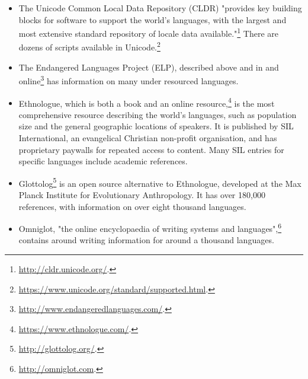 \begin{itemize}
\item The Unicode Common Local Data Repository (CLDR) "provides key building blocks for software to support the world's languages, with the largest and most extensive standard repository of locale data available."\footnote{\href{http://cldr.unicode.org/}{http://cldr.unicode.org/}. } There are dozens of scripts available in Unicode.\footnote{\href{https://www.unicode.org/standard/supported.html}{https://www.unicode.org/standard/supported.html}. }

\item The Endangered Languages Project (ELP), described above and in \citet{lee2016assessing} and online\footnote{\href{http://www.endangeredlanguages.com/}{http://www.endangeredlanguages.com/}. } has information on many under resourced languages.

\item Ethnologue, which is both a book \citep{lewis2009ethnologue} and an online resource,\footnote{\href{https://www.ethnologue.com/}{https://www.ethnologue.com/}. } is the most comprehensive resource describing the world's languages, such as population size and the general geographic locations of speakers. It is published by SIL International, an evangelical Christian non-profit organisation, and has proprietary paywalls for repeated access to content. Many SIL entries for specific languages include academic references.

\item Glottolog\footnote{\href{http://glottolog.org/}{http://glottolog.org/}. } is an open source alternative to Ethnologue, developed at the Max Planck Institute for Evolutionary Anthropology. It has over 180,000 references, with information on over eight thousand languages. \citep{hammarstrom2015glottolog}

\item Omniglot, "the online encyclopaedia of writing systems and languages",\footnote{\href{http://omniglot.com}{http://omniglot.com}. } contains around writing information for around a thousand languages. \citep{ager2008omniglot}


\end{itemize}
